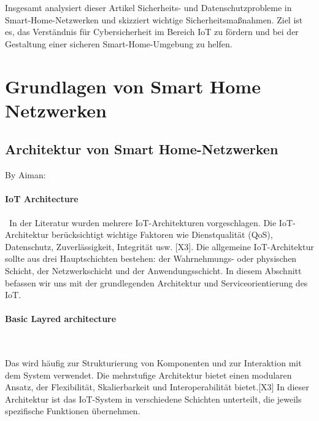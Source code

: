 Insgesamt analysiert dieser Artikel Sicherheits- und Datenschutzprobleme in Smart-Home-Netzwerken und skizziert wichtige Sicherheitsmaßnahmen. Ziel ist es, das Verständnis für Cybersicherheit im Bereich IoT zu fördern und bei der Gestaltung einer sicheren Smart-Home-Umgebung zu helfen.


\newpage
\section{Grundlagen von Smart Home Netzwerken}

\subsection{Architektur von Smart Home-Netzwerken}
By Aiman:

\paragraph{IoT Architecture}\ 
In der Literatur wurden mehrere IoT-Architekturen vorgeschlagen. Die IoT-Architektur berücksichtigt wichtige Faktoren wie Dienstqualität (QoS), Datenschutz, Zuverlässigkeit, Integrität usw. [X3]. Die allgemeine IoT-Architektur sollte aus drei Hauptschichten bestehen: der  Wahrnehmungs- oder physischen Schicht, der Netzwerkschicht und der Anwendungsschicht. In diesem Abschnitt befassen wir uns mit der grundlegenden Architektur und Serviceorientierung des IoT.

\paragraph{Basic Layred architecture}\

Das wird häufig zur Strukturierung von Komponenten und zur Interaktion mit dem System verwendet. Die mehrstufige Architektur bietet einen modularen Ansatz, der Flexibilität, Skalierbarkeit und Interoperabilität bietet.[X3] In dieser Architektur ist das IoT-System in verschiedene Schichten unterteilt, die jeweils spezifische Funktionen übernehmen. 

